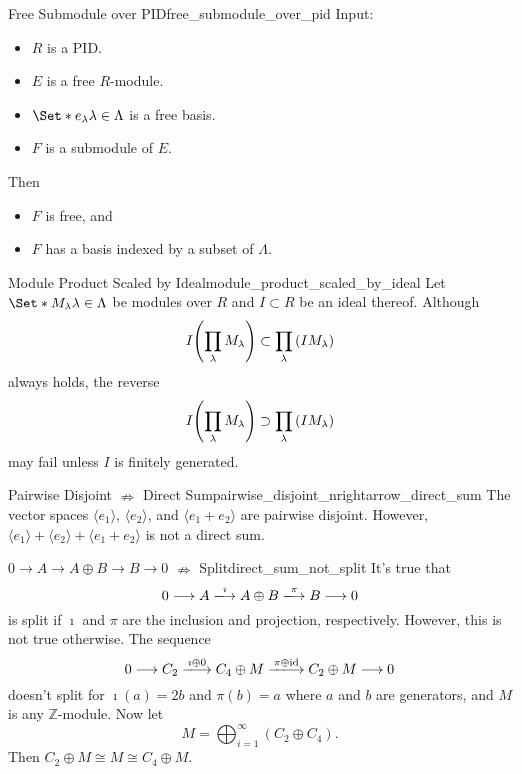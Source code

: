 \documentclass{article}
\begin{document}
\begin{theorem}{Free Submodule over PID}{free_submodule_over_pid}
    Input:
    \begin{itemize}
        \item $R$ is a PID.
        \item $E$ is a free $R$-module.
        \item $\Set*{e_\lambda}{\lambda\in\Lambda}$ is a free basis.
        \item $F$ is a submodule of $E$.
    \end{itemize}
    Then
    \begin{itemize}
        \item $F$ is free, and
        \item $F$ has a basis indexed by a subset of $\Lambda$.
    \end{itemize}
\end{theorem}

\begin{counterexample}{Module Product Scaled by Ideal}{module_product_scaled_by_ideal}
    Let $\Set*{M_\lambda}{\lambda\in\Lambda}$ be modules over $R$ and $I\subset R$ be an ideal thereof.
    Although
    \[ I\qty(\prod_\lambda M_\lambda) \subset \prod_\lambda \qty(I M_\lambda) \]
    always holds, the reverse
    \[ I\qty(\prod_\lambda M_\lambda) \supset \prod_\lambda \qty(I M_\lambda) \]
    may fail unless $I$ is finitely generated.
\end{counterexample}

\begin{counterexample}{Pairwise Disjoint $\nRightarrow$ Direct Sum}{pairwise_disjoint_nrightarrow_direct_sum}
    The vector spaces $\langle e_1 \rangle$, $\langle e_2 \rangle$, and $\langle e_1+e_2 \rangle$ are pairwise disjoint.
    However, $\langle e_1 \rangle + \langle e_2 \rangle + \langle e_1+e_2 \rangle$ is not a direct sum.
\end{counterexample}

\begin{counterexample}{$0\rightarrow A \rightarrow A\oplus B \rightarrow B \rightarrow 0$ $\nRightarrow$ Split}{direct_sum_not_split}
    It's true that
    \[ 0 \longrightarrow A \xlongrightarrow{\imath} A\oplus B \xlongrightarrow{\pi} B \longrightarrow 0 \]
    is split if $\imath$ and $\pi$ are the inclusion and projection, respectively.
    However, this is not true otherwise.
    The sequence
    \[ 0 \longrightarrow C_2 \xlongrightarrow{\imath \oplus 0} C_4 \oplus M \xlongrightarrow{\pi \oplus \operatorname{id}} C_2 \oplus M \longrightarrow 0 \]
    doesn't split for $\imath(a) = 2b$ and $\pi(b) = a$ where $a$ and $b$ are generators, and $M$ is any $\mathbb{Z}$-module.
    Now let
    \[ M = \bigoplus_{i=1}^\infty (C_2 \oplus C_4). \]
    Then $C_2 \oplus M \cong M \cong C_4 \oplus M$.
\end{counterexample}
\end{document}

